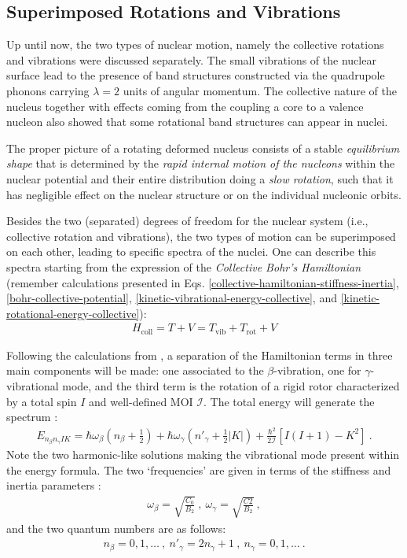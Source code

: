 \subsection{Superimposed Rotations and Vibrations}

Up until now, the two types of nuclear motion, namely the collective rotations and vibrations were discussed separately. The small vibrations of the nuclear surface lead to the presence of band structures constructed via the quadrupole phonons carrying $\lambda=2$ units of angular momentum. The collective nature of the nucleus together with effects coming from the coupling a core to a valence nucleon also showed that some rotational band structures can appear in nuclei.

The proper picture of a rotating deformed nucleus consists of a stable \emph{equilibrium shape} that is determined by the \emph{rapid internal motion of the nucleons} within the nuclear potential and their entire distribution doing a \emph{slow rotation}, such that it has negligible effect on the nuclear structure or on the individual nucleonic orbits.

Besides the two (separated) degrees of freedom for the nuclear system (i.e., collective rotation and vibrations), the two types of motion can be superimposed on each other, leading to specific spectra of the nuclei. One can describe this spectra starting from the expression of the \emph{Collective Bohr's Hamiltonian} (remember calculations presented in Eqs. \ref{collective-hamiltonian-stiffness-inertia}, \ref{bohr-collective-potential}, \ref{kinetic-vibrational-energy-collective}, and \ref{kinetic-rotational-energy-collective}):
\begin{align}
    H_\text{coll}=T+V=T_\text{vib}+T_\text{rot}+V
\end{align}

Following the calculations from \cite{li2022model}, a separation of the Hamiltonian terms in three main components will be made: one associated to the $\beta$-vibration, one for $\gamma$-vibrational mode, and the third term is the rotation of a rigid rotor characterized by a total spin $I$ and well-defined MOI $\mathcal{I}$. The total energy will generate the spectrum \cite{ring2004nuclear,li2022model}:
\begin{align}
    E_{n_\beta n_\gamma IK}=\hbar\omega_\beta\left(n_\beta+\frac{1}{2}\right)+\hbar\omega_\gamma\left(n'_\gamma+\frac{1}{2}|K|\right)+\frac{\hbar^2}{2\mathcal{I}}\left[I(I+1)-K^2\right]\ .
    \label{collective-rotation-vibration-energy-spectrum}
\end{align}
Note the two harmonic-like solutions making the vibrational mode present within the energy formula. The two `frequencies' are given in terms of the stiffness and inertia parameters \cite{li2022model}:
\begin{align}
\omega_\beta=\sqrt{\frac{C_0}{B_2}}\ ,\ \omega_\gamma=\sqrt{\frac{C2}{B_2}}\ ,   
\end{align}
and the two quantum numbers are as follows: 
\begin{align}
    n_\beta=0,1,\dots\ ,\ n'_\gamma=2n_\gamma+1\ ,\ n_\gamma=0,1,\dots\ .
\end{align}

